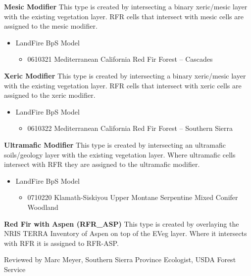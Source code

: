 \begin{adjustwidth}{2cm}{}
\noindent \textbf{Mesic Modifier } This type is created by intersecting a binary xeric/mesic layer with the existing vegetation layer. RFR cells that intersect with mesic cells are assigned to the mesic modifier.
\begin{itemize}
	\item LandFire BpS Model
	\begin{itemize}
		\item 0610321 Mediterranean California Red Fir Forest – Cascades
	\end{itemize}
\end{itemize}

\noindent \textbf{Xeric Modifier} This type is created by intersecting a binary xeric/mesic layer with the existing vegetation layer. RFR cells that intersect with xeric cells are assigned to the xeric modifier.
\begin{itemize}
	\item LandFire BpS Model
	\begin{itemize}
		\item 0610322 Mediterranean California Red Fir Forest – Southern Sierra
	\end{itemize}
\end{itemize}

\noindent \textbf{Ultramafic Modifier} This type is created by intersecting an ultramafic soils/geology layer with the existing vegetation layer. Where ultramafic cells intersect with RFR they are assigned to the ultramafic modifier.
\begin{itemize}
	\item LandFire BpS Model
	\begin{itemize}
		\item 0710220 Klamath-Siskiyou Upper Montane Serpentine Mixed Conifer Woodland
	\end{itemize}
\end{itemize}


\noindent \textbf{Red Fir with Aspen (RFR\_ASP)} This type is created by overlaying the NRIS TERRA Inventory of Aspen on top of the EVeg layer. Where it intersects with RFR it is assigned to RFR-ASP. \\

\end{adjustwidth}

\noindent Reviewed by Marc Meyer, Southern Sierra Province Ecologist, USDA Forest Service

